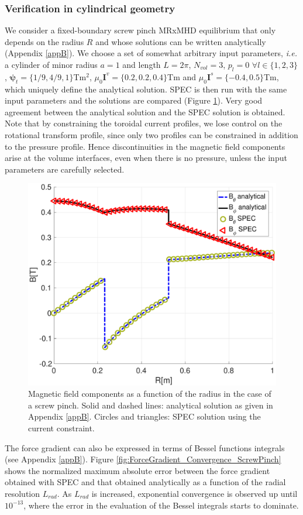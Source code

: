 \documentclass[my_thesis.tex]{subfiles}
\begin{document}
\subsubsection{Verification in cylindrical geometry}

We consider a fixed-boundary screw pinch \ac{MRxMHD} equilibrium that only depends on the radius $R$ and whose solutions can be written analytically (Appendix \ref{appB}). We choose a set of somewhat arbitrary input parameters, \textit{i.e.} a cylinder of minor radius $a=1$ and length $L=2\pi$, $N_{vol}=3$, $p_l=0$ $\forall l\in\{1,2,3\}$, $\bm{\psi}_t = \{1/9, 4/9, 1\}$Tm${}^2$, $\mu_0\mathbf{I}^v=\{0.2,0.2,0.4\}$Tm and $\mu_0\mathbf{I}^s=\{-0.4,0.5\}$Tm, which uniquely define the analytical solution. \ac{SPEC} is then run with the same input parameters and the solutions are compared (Figure \ref{fig:SP_constraint_verification}). Very good agreement between the analytical solution and the \ac{SPEC} solution is obtained. Note that by constraining the toroidal current profiles, we lose control on the rotational transform profile, since only two profiles can be constrained in addition to the pressure profile. Hence discontinuities in the magnetic field components arise at the volume interfaces, even when there is no pressure, unless the input parameters are carefully selected.

\begin{figure}
	\centering
	\includegraphics[width=0.5\linewidth]{main/Figures_CurrentConstraint/ABaillod_fig6.pdf}
	\caption{Magnetic field components as a function of the radius in the case of a screw pinch. Solid and dashed lines: analytical solution as given in Appendix \ref{appB}. Circles and triangles: \ac{SPEC} solution using the current constraint.}
	\label{fig:SP_constraint_verification}
\end{figure}
The force gradient can also be expressed in terms of Bessel functions integrals (see Appendix \ref{appB}). Figure \ref{fig:ForceGradient_Convergence_ScrewPinch} shows the normalized maximum absolute error between the force gradient obtained with \ac{SPEC} and that obtained analytically as a function of the radial resolution $L_{rad}$. As $L_{rad}$ is increased, exponential convergence is observed up until $10^{-13}$, where the error in the evaluation of the Bessel integrals starts to dominate. 
\end{document}
